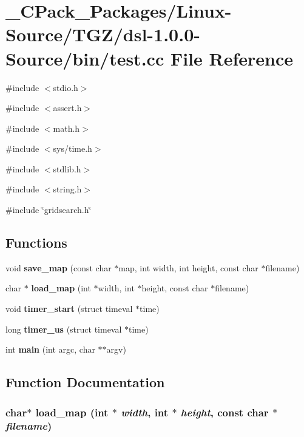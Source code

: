 \section{\_\-CPack\_\-Packages/Linux-\/Source/TGZ/dsl-\/1.0.0-\/Source/bin/test.cc File Reference}
\label{__CPack__Packages_2Linux-Source_2TGZ_2dsl-1_80_80-Source_2bin_2test_8cc}
{\ttfamily \#include $<$stdio.h$>$}\par
{\ttfamily \#include $<$assert.h$>$}\par
{\ttfamily \#include $<$math.h$>$}\par
{\ttfamily \#include $<$sys/time.h$>$}\par
{\ttfamily \#include $<$stdlib.h$>$}\par
{\ttfamily \#include $<$string.h$>$}\par
{\ttfamily \#include \char`\"{}gridsearch.h\char`\"{}}\par
\subsection*{Functions}
\begin{DoxyCompactItemize}
\item 
void {\bf save\_\-map} (const char $\ast$map, int width, int height, const char $\ast$filename)
\item 
char $\ast$ {\bf load\_\-map} (int $\ast$width, int $\ast$height, const char $\ast$filename)
\item 
void {\bf timer\_\-start} (struct timeval $\ast$time)
\item 
long {\bf timer\_\-us} (struct timeval $\ast$time)
\item 
int {\bf main} (int argc, char $\ast$$\ast$argv)
\end{DoxyCompactItemize}


\subsection{Function Documentation}
\subsubsection[{load\_\-map}]{\setlength{\rightskip}{0pt plus 5cm}char$\ast$ load\_\-map (int $\ast$ {\em width}, \/  int $\ast$ {\em height}, \/  const char $\ast$ {\em filename})}\label{__CPack__Packages_2Linux-Source_2TGZ_2dsl-1_80_80-Source_2bin_2test_8cc_a358a7f4a8709529d700da886d011fb71}

